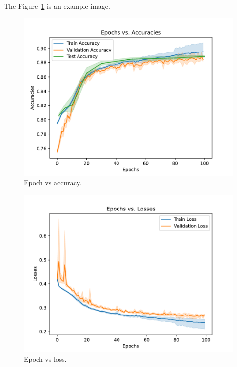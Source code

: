 \documentclass[sigplan,screen]{acmart}
\begin{document}


The Figure~\ref{fig:epochs-vs-accuracy-a} is an example image.

\begin{figure}[htb]
\centering\includegraphics[width=1.0\columnwidth]{images/epoch_vs_accuracy.pdf}
\caption{Epoch vs accuracy.}
\label{fig:epochs-vs-accuracy-a}
\end{figure}


\begin{figure}[htb]
\centering\includegraphics[width=1.0\columnwidth]{images/epoch_vs_loss.pdf}
\caption{Epoch vs loss.}
\label{fig:epochs-vs-accuracy-b}
\end{figure}
\end{document}

